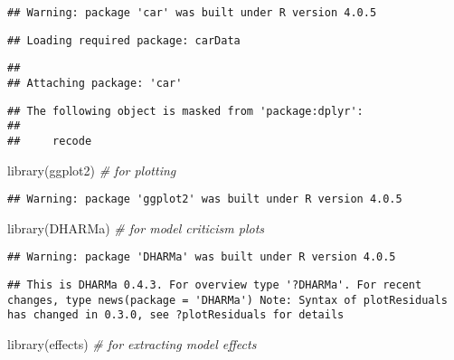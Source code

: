 \documentclass[
]{article}
\newenvironment{Shaded}{\begin{snugshade}}{\end{snugshade}}
\newcommand{\CommentTok}[1]{\textcolor[rgb]{0.56,0.35,0.01}{\textit{#1}}}
\newcommand{\FunctionTok}[1]{\textcolor[rgb]{0.00,0.00,0.00}{#1}}
\newcommand{\NormalTok}[1]{#1}
\begin{document}
\begin{verbatim}
## Warning: package 'car' was built under R version 4.0.5
\end{verbatim}

\begin{verbatim}
## Loading required package: carData
\end{verbatim}

\begin{verbatim}
## 
## Attaching package: 'car'
\end{verbatim}

\begin{verbatim}
## The following object is masked from 'package:dplyr':
## 
##     recode
\end{verbatim}

\begin{Shaded}
\begin{Highlighting}[]
\FunctionTok{library}\NormalTok{(ggplot2) }\CommentTok{\# for plotting}
\end{Highlighting}
\end{Shaded}

\begin{verbatim}
## Warning: package 'ggplot2' was built under R version 4.0.5
\end{verbatim}

\begin{Shaded}
\begin{Highlighting}[]
\FunctionTok{library}\NormalTok{(DHARMa) }\CommentTok{\# for model criticism plots}
\end{Highlighting}
\end{Shaded}

\begin{verbatim}
## Warning: package 'DHARMa' was built under R version 4.0.5
\end{verbatim}

\begin{verbatim}
## This is DHARMa 0.4.3. For overview type '?DHARMa'. For recent changes, type news(package = 'DHARMa') Note: Syntax of plotResiduals has changed in 0.3.0, see ?plotResiduals for details
\end{verbatim}

\begin{Shaded}
\begin{Highlighting}[]
\FunctionTok{library}\NormalTok{(effects) }\CommentTok{\# for extracting model effects}
\end{Highlighting}
\end{Shaded}
\end{document}
